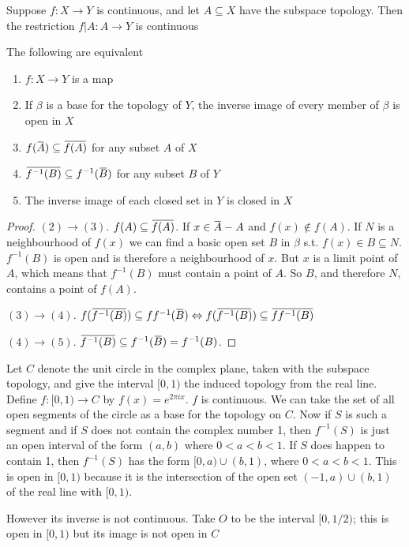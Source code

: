 \documentclass[11pt]{article}
\begin{document}
\begin{theorem}[]
Suppose \(f:X\to Y\) is continuous, and let \(A\subseteq X\) have the
subspace topology. Then the restriction \(f|A:A\to Y\) is continuous
\end{theorem}

\begin{theorem}[]
The following are equivalent
\begin{enumerate}
\item \(f:X\to Y\) is a map
\item If \(\beta\) is a base for the topology of \(Y\), the inverse image of every
member of \(\beta\) is open in \(X\)
\item \(f(\bbar{A})\subseteq\bbar{f(A)}\) for any subset \(A\) of \(X\)
\item \(\bbar{f^{-1}(B)}\subseteq f^{-1}(\bbar{B})\) for any subset \(B\)
of \(Y\)
\item The inverse image of each closed set in \(Y\) is closed in \(X\)
\end{enumerate}
\end{theorem}

\begin{proof}
\((2)\to(3)\). \(f(A)\subseteq\bbar{f(A)}\). If \(x\in\bbar{A}-A\) and
\(f(x)\not\in f(A)\). If \(N\) is a neighbourhood of \(f(x)\) we can find a
basic open set \(B\) in \(\beta\) s.t. \(f(x)\in B\subseteq N\). \(f^{-1}(B)\) is
open and is therefore a neighbourhood of \(x\). But \(x\) is a limit point of
\(A\), which means that \(f^{-1}(B)\) must contain a point of \(A\). So
\(B\), and therefore \(N\), contains a point of \(f(A)\).

\((3)\to(4)\).
\(f(\bbar{f^{-1}(B)})\subseteq ff^{-1}(\bbar{B})\Leftrightarrow
   f(\bbar{f^{-1}(B)})\subseteq\bbar{ff^{-1}(B)}\)

\((4)\to(5)\).
\(\bbar{f^{-1}(B)}\subseteq f^{-1}(\bbar{B})=f^{-1}(B)\).
\end{proof}

\begin{examplle}[]
Let \(C\) denote the unit circle in the complex plane, taken with the
subspace topology, and give the interval \([0,1)\) the induced topology from
the real line. Define \(f:[0,1)\to C\) by \(f(x)=e^{2\pi ix}\). \(f\) is
continuous.
We can take the set of all open segments of the circle as a base for the
topology on \(C\). Now if \(S\) is such a segment and if \(S\) does not
contain the complex number 1, then \(f^{-1}(S)\) is just an open interval of
the form \((a,b)\) where \(0<a<b<1\). If \(S\) does happen to contain 1, then
\(f^{-1}(S)\) has the form \([0,a)\cup(b,1)\), where \(0<a<b<1\). This is
open in \([0,1)\) because it is the intersection of the open set
\((-1,a)\cup(b,1)\) of the real line with \([0,1)\).

However its inverse is not continuous. Take \(O\) to be the interval
\([0,1/2)\); this is open in \([0,1)\) but its image is not open in \(C\)
\end{examplle}
\end{document}
